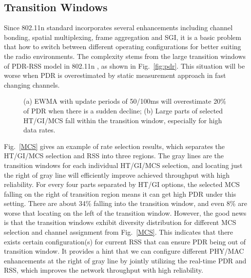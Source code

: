 \documentclass[draftclsnofoot,conference,onecolumn,11pt]{IEEEtran}
\begin{document}
\subsection{Transition Windows}
Since 802.11n standard incorporates several enhancements including channel bonding, spatial multiplexing, frame aggregation and SGI, it is a basic problem that how to switch between different operating configurations for better suiting the radio environments. The complexity stems from the large transition windows of PDR-RSS model in 802.11n \cite{Halperin2010predictable}, as shown in Fig.~\ref{fig:pdr}. This situation will be worse when PDR is overestimated by static measurement approach in fast changing channels.

\begin{figure}[!htp]
\centerline{
}
\caption{(a) EWMA with update periods of 50/100ms will overestimate 20\% of PDR when there is a sudden decline; (b) Large parts of selected HT/GI/MCS fall within the transition window, especially for high data rates.}
\label{pdr-rss}
\end{figure}

Fig.~\ref{MCS} gives an example of rate selection results, which separates the HT/GI/MCS selection and RSS into three regions. The gray lines are the transition windows for each individual HT/GI/MCS selection, and locating just the right of gray line will efficiently improve achieved throughput with high reliability. For every four parts separated by HT/GI options, the selected MCS falling on the right of transition region means it can get high PDR under this setting. There are about 34\% falling into the transition window, and even 8\% are worse that locating on the left of the transition window. However, the good news is that the transition windows exhibit diversity distribution for different MCS selection and channel assignment from Fig.~\ref{MCS}. This indicates that there exists certain configuration(s) for current RSS that can ensure PDR being out of transition window. It provides a hint that we can configure different PHY/MAC enhancements at the right of gray line by jointly utilizing the real-time PDR and RSS, which improves the network throughput with high reliability.
\end{document}
